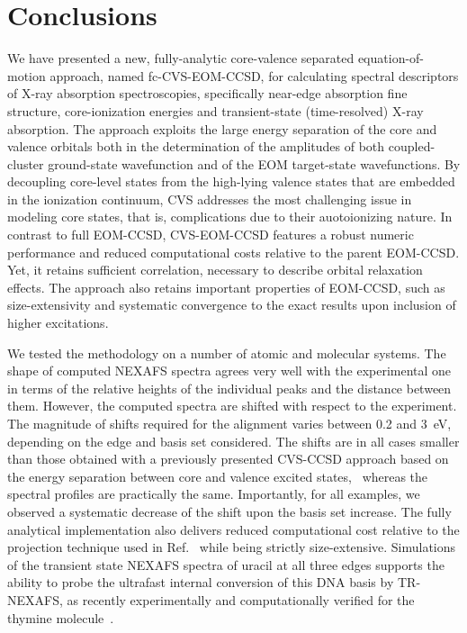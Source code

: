 \documentclass[journal=jctcce,manuscript=article]{achemso}
\begin{document}
\section{Conclusions}
We have presented a new, fully-analytic core-valence separated 
equation-of-motion approach, named fc-CVS-EOM-CCSD, for calculating spectral descriptors of X-ray absorption
spectroscopies, specifically near-edge absorption fine structure, core-ionization energies and transient-state
(time-resolved) X-ray absorption. The approach exploits the large energy separation of the core and valence orbitals
both in the determination of the amplitudes of both coupled-cluster
ground-state wavefunction and of the EOM target-state wavefunctions.
By decoupling core-level states from the high-lying valence states that are embedded in the ionization continuum, CVS
addresses the most challenging issue in modeling core states, that is,
complications due to their auotoionizing nature.
In contrast to full EOM-CCSD, CVS-EOM-CCSD features a robust numeric performance and reduced computational costs
relative to the parent EOM-CCSD. Yet, it retains sufficient correlation, necessary to describe orbital relaxation
effects. The approach also retains important properties of EOM-CCSD, such as size-extensivity and 
systematic convergence to the exact results upon inclusion of higher excitations.

We tested the methodology on a number of atomic and molecular systems. The shape of computed NEXAFS spectra agrees very well with the experimental one in terms of the relative heights of the individual peaks and the distance between them. However, the computed spectra are shifted with respect to the experiment. The magnitude of shifts required for the alignment varies between 0.2 and 3~eV, depending on the edge and basis set considered.
The shifts are in all cases smaller than those obtained with a previously presented CVS-CCSD approach based on the energy separation between core and valence excited states,~\cite{coriani2015jcp} whereas the spectral profiles are practically the same. Importantly, for all examples, we observed a systematic decrease of the shift upon the basis set increase.
The fully analytical implementation also delivers reduced computational 
cost relative to the projection technique used in Ref.~
while being strictly size-extensive.  
Simulations of the transient state NEXAFS spectra of uracil at all three edges supports the ability to probe the ultrafast internal conversion of this DNA basis by 
TR-NEXAFS, as recently experimentally and computationally verified for the thymine molecule~\cite{naturecomm}.
\end{document}
